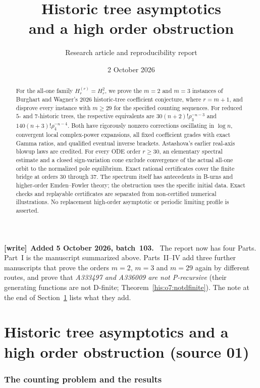 \documentclass[11pt]{article}
\title{Historic tree asymptotics\\and a high order obstruction}
\author{Research article and reproducibility report}
\date{2 October 2026}
\theoremstyle{remark}\newtheorem{remark}[theorem]{Remark}
\numberwithin{equation}{section}
\newenvironment{writenote}[1][]{\par\smallskip\begingroup\small
 \noindent\textbf{[write]}\if\relax\detokenize{#1}\relax\else~\textbf{#1.}\fi\ }%
 {\par\endgroup\smallskip}
\begin{document}
\maketitle
\begin{abstract}
For the all-one family $H_r^{(r)}=H_r^2$, we prove the $m=2$ and $m=3$ instances of Burghart and Wagner's 2026 historic-tree coefficient conjecture, where $r=m+1$, and disprove every instance with $m\ge29$ for the specified counting sequences. For reduced $5$- and $7$-historic trees, the respective equivalents are $30(n+2)!\rho_3^{-n-3}$ and $140(n+3)!\rho_4^{-n-4}$. Both have rigorously nonzero corrections oscillating in $\log n$, convergent local complex-power expansions, all fixed coefficient grades with exact Gamma ratios, and qualified eventual inverse brackets. Astashova's earlier real-axis blowup laws are credited. For every ODE order $r\ge30$, an elementary spectral estimate and a closed sign-variation cone exclude convergence of the actual all-one orbit to the normalized pole equilibrium. Exact rational certificates cover the finite bridge at orders $30$ through $37$. The spectrum itself has antecedents in B-urns and higher-order Emden--Fowler theory; the obstruction uses the specific initial data. Exact checks and replayable certificates are separated from non-certified numerical illustrations. No replacement high-order asymptotic or periodic limiting profile is asserted.
\end{abstract}

\begin{writenote}[Added 5 October 2026, batch~103]
The report now has four Parts. Part~I is the manuscript summarized above. Parts~II--IV add three further manuscripts that prove the orders $m=2$, $m=3$ and $m=29$ again by different routes, and prove that \emph{A333497 and A336009 are not P-recursive} (their generating functions are not D-finite; Theorem~\ref{his:o7:notdfinite}). The note at the end of Section~\ref{his:sec:results} lists what they add.
\end{writenote}
\setcounter{tocdepth}{1}
{\small\tableofcontents}
\newpage

\part{Historic tree asymptotics and a high order obstruction (source 01)}\label{his:part:one}

\section{The counting problem and the results}\label{his:sec:results}
\end{document}
